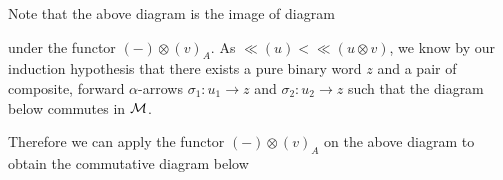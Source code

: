 \begin{prf}
\begin{center}
        \end{center}
        Note that the above diagram 
        is the image of diagram 
        \begin{center}
        \end{center}
        under the functor $(-)\otimes (v)_A$. As $\ll(u) < \ll(u\otimes v)$, 
        we know by our induction hypothesis that 
        there exists a pure binary word $z$
        and a pair of composite, forward $\alpha$-arrows $\sigma_1: u_1 \to z$ and 
        $\sigma_2: u_2 \to z$ such that the diagram below commutes in $\mathcal{M}$.
        \begin{center}
        \end{center}
        Therefore we can apply the functor 
        $(-)\otimes (v)_A$ on the above diagram 
        to obtain the commutative diagram below
        \begin{center}
\end{center}
\end{prf}
